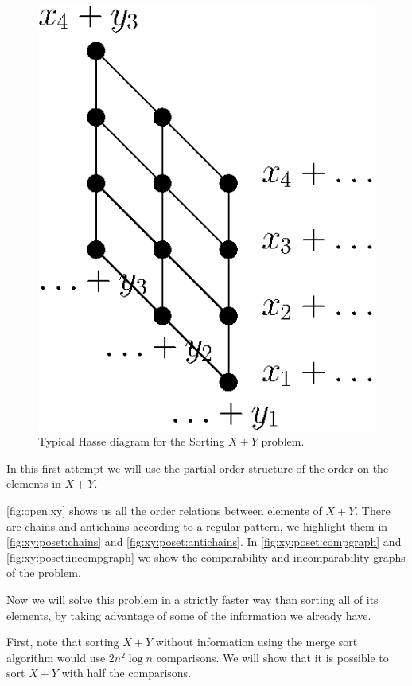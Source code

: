 \begin{figure}
	\centering
	\includegraphics[height=0.2\textheight]{fig/open/x+y}
	\caption{Typical Hasse diagram for the Sorting $X + Y$ problem.}
	\label{fig:xy:poset:mergexy}
\end{figure}


In this first attempt we will use the partial order structure of the order on
the elements in $X + Y$.

\ref{fig:open:xy} shows us all the order relations between elements of $X + Y$.
There are chains and antichains according to a regular pattern, we highlight
them in \ref{fig:xy:poset:chains} and \ref{fig:xy:poset:antichains}. In
\ref{fig:xy:poset:compgraph} and \ref{fig:xy:poset:incompgraph} we show the
comparability and incomparability graphs of the problem.

Now we will solve this problem in a strictly faster way than sorting all
of its elements, by taking advantage of some of the information we already have.

First, note that sorting $X + Y$ without information using the merge sort
algorithm would use $2 n^2 \log n$ comparisons. We will show that it is
possible to sort $X + Y$ with half the comparisons.

